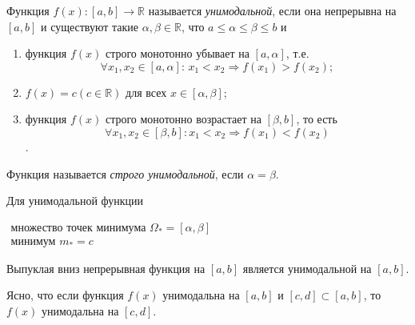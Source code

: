 
\begin{definition}
	Функция $f(x): [a, b] \to \mathbb{R}$ называется \textit{унимодальной}, если она непрерывна на $[a, b]$ и существуют такие $\alpha, \beta \in \mathbb{R}$, что $a \leqslant \alpha \leqslant \beta \leqslant b$ и 
	\begin{enumerate}[label={\arabic*)}]
		\item функция $f(x)$ строго монотонно убывает на $[a, \alpha]$, т.е.
      \[
        \forall x_1, x_2 \in [a, \alpha] : \, x_1 < x_2 \Rightarrow f(x_1) > f(x_2);
      \]
		
		\item $f(x) = c (c \in \mathbb{R})$ для всех $x \in [\alpha, \beta]$;
		
		\item функция $f(x)$ строго монотонно возрастает на $[\beta, b]$, то есть
      \[
        \forall x_1, x_2 \in [\beta, b] : x_1 < x_2 \Rightarrow f(x_1) < f(x_2)
      \]
      .
	\end{enumerate}
	
	Функция называется \textit{строго унимодальной}, если $\alpha = \beta$.
\end{definition}

\begin{utv}
	Для унимодальной функции
	
	$\begin{array}{l}
		\text{множество точек минимума } \Omega_{\ast} = [\alpha, \beta] \\
		\text{минимум } m_{\ast} = c
	\end{array}$
\end{utv}

\begin{utv}
	Выпуклая вниз непрерывная функция на $[a, b]$ является унимодальной на $[a, b]$.
\end{utv}

\begin{utv}
	Ясно, что если функция $f(x)$ унимодальна на $[a, b]$ и $[c, d] \subset [a, b]$, то $f(x)$ унимодальна на $[c, d]$. 
\end{utv}


